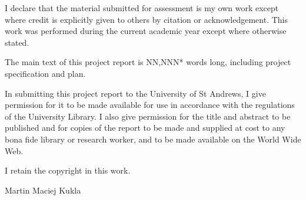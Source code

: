 

\noindent I declare that the material submitted for assessment is my own work except where credit is explicitly given to others by citation or acknowledgement. This work was performed during the current academic year except where otherwise stated. 

\vspace{20pt}

\noindent The main text of this project report is NN,NNN* words long, including project specification and plan. 


\vspace{20pt}

\noindent In submitting this project report to the University of St Andrews, I give permission for it to be made available for use in accordance with the regulations of the University Library. I also give permission for the title and abstract to be published and for copies of the report to be made and supplied at cost to any bona fide library or research worker, and to be made available on the World Wide Web. 


\vspace{20pt}

\noindent I retain the copyright in this work. 


\vspace{20pt}

\noindent Martin Maciej Kukla
